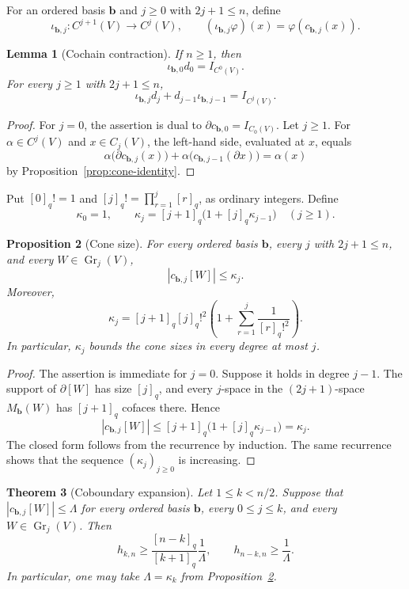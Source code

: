 \documentclass[11pt]{article}
\numberwithin{equation}{section}
\newtheorem{theorem}{Theorem}[section]
\newtheorem{lemma}[theorem]{Lemma}
\newtheorem{proposition}[theorem]{Proposition}
\newcommand{\Gr}{\operatorname{Gr}}
\begin{document}
For an ordered basis $\mathbf b$ and $j\ge0$ with $2j+1\le n$,
define
\[
 \iota_{\mathbf b,j}:C^{j+1}(V)\longrightarrow C^j(V),
 \qquad
 (\iota_{\mathbf b,j}\varphi)(x)
 =
 \varphi(c_{\mathbf b,j}(x)).
\]

\begin{lemma}[Cochain contraction]\label{lem:cochain-contraction}
If $n\ge1$, then
\[
 \iota_{\mathbf b,0}d_0=I_{C^0(V)}.
\]
For every $j\ge1$ with $2j+1\le n$,
\[
 \iota_{\mathbf b,j}d_j
 +
 d_{j-1}\iota_{\mathbf b,j-1}
 =
 I_{C^j(V)}.
\]
\end{lemma}

\begin{proof}
For $j=0$, the assertion is dual to
$\partial c_{\mathbf b,0}=I_{C_0(V)}$. Let $j\ge1$. For
$\alpha\in C^j(V)$ and $x\in C_j(V)$, the left-hand side,
evaluated at $x$, equals
\[
 \alpha\bigl(\partial c_{\mathbf b,j}(x)\bigr)
 +
 \alpha\bigl(c_{\mathbf b,j-1}(\partial x)\bigr)
 =
 \alpha(x)
\]
by Proposition~\ref{prop:cone-identity}.
\end{proof}

Put $[0]_q!=1$ and
$[j]_q!=\prod_{r=1}^j[r]_q$, as ordinary integers. Define
\[
 \kappa_0=1,
 \qquad
 \kappa_j=[j+1]_q\bigl(1+[j]_q\kappa_{j-1}\bigr)
 \quad(j\ge1).
\]

\begin{proposition}[Cone size]\label{prop:cone-size}
For every ordered basis $\mathbf b$, every $j$ with $2j+1\le n$,
and every $W\in\Gr_j(V)$,
\[
 |c_{\mathbf b,j}[W]|\le\kappa_j.
\]
Moreover,
\[
 \kappa_j
 =
 [j+1]_q[j]_q!^2
 \left(
 1+\sum_{r=1}^j\frac{1}{[r]_q!^2}
 \right).
\]
In particular, $\kappa_j$ bounds the cone sizes in every degree at most
$j$.
\end{proposition}

\begin{proof}
The assertion is immediate for $j=0$. Suppose it holds in degree
$j-1$. The support of $\partial[W]$ has size $[j]_q$, and every
$j$-space in the $(2j+1)$-space $M_{\mathbf b}(W)$ has
$[j+1]_q$ cofaces there. Hence
\[
 |c_{\mathbf b,j}[W]|
 \le
 [j+1]_q\bigl(1+[j]_q\kappa_{j-1}\bigr)
 =\kappa_j.
\]
The closed form follows from the recurrence by induction. The same
recurrence shows that the sequence $(\kappa_j)_{j\ge0}$ is increasing.
\end{proof}

\begin{theorem}[Coboundary expansion]
\label{thm:grassmann-coboundary-expansion}
Let $1\le k<n/2$. Suppose that
$|c_{\mathbf b,j}[W]|\le\Lambda$ for every ordered basis $\mathbf b$,
every $0\le j\le k$, and every $W\in\Gr_j(V)$. Then
\[
 h_{k,n}
 \ge
 \frac{[n-k]_q}{[k+1]_q}\frac1\Lambda,
 \qquad
 h_{n-k,n}\ge\frac1\Lambda.
\]
In particular, one may take $\Lambda=\kappa_k$ from
Proposition~\ref{prop:cone-size}.
\end{theorem}
\end{document}
